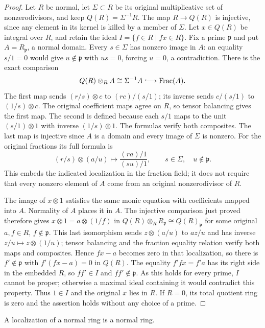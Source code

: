 \begin{proof}
Let $R$ be normal, let $\Sigma\subset R$ be its original
multiplicative set of nonzerodivisors, and keep
$Q(R)=\Sigma^{-1}R$. The map $R\to Q(R)$ is injective,
since any element in its kernel is killed by a member of $\Sigma$.
Let $x\in Q(R)$ be integral over $R$, and retain the ideal
$I=\{f\in R\mid fx\in R\}$.
Fix a prime $\mathfrak p$ and put $A=R_{\mathfrak p}$, a
normal domain. Every $s\in\Sigma$ has nonzero image in $A$:
an equality $s/1=0$ would give $u\notin\mathfrak p$ with
$us=0$, forcing $u=0$, a contradiction.
There is the exact comparison
$$
Q(R)\otimes_RA\cong\Sigma^{-1}A
\lhook\joinrel\longrightarrow\operatorname{Frac}(A).
$$
The first map sends $(r/s)\otimes c$ to $(rc)/(s/1)$;
its inverse sends $c/(s/1)$ to $(1/s)\otimes c$.
The original coefficient maps agree on $R$, so tensor balancing
gives the first map. The second is defined because each $s/1$
maps to the unit $(s/1)\otimes1$ with inverse $(1/s)\otimes1$.
The formulas verify both composites. The last map is injective
since $A$ is a domain and every image of $\Sigma$ is nonzero.
For the original fractions its full formula is
$$
(r/s)\otimes(a/u)\longmapsto
\frac{(ra)/1}{(su)/1},\qquad
s\in\Sigma,\quad u\notin\mathfrak p.
$$
This embeds the indicated localization in the fraction field;
it does not require that every nonzero element of $A$ come from
an original nonzerodivisor of $R$.

The image of $x\otimes1$ satisfies the same monic equation
with coefficients mapped into $A$. Normality of $A$ places
it in $A$. The injective comparison just proved therefore gives
$x\otimes1=a\otimes(1/f)$ in
$Q(R)\otimes_RR_{\mathfrak p}\cong Q(R)_{\mathfrak p}$ for
some original $a,f\in R$, $f\notin\mathfrak p$.
This last isomorphism sends $z\otimes(a/u)$ to $az/u$
and has inverse $z/u\mapsto z\otimes(1/u)$; tensor balancing
and the fraction equality relation verify both maps and composites.
Hence $fx-a$ becomes zero in that localization, so there is
$f'\notin\mathfrak p$ with $f'(fx-a)=0$ in $Q(R)$.
The equality $f'fx=f'a$ has its right side in the embedded $R$,
so $ff'\in I$ and $ff'\notin\mathfrak p$.
As this holds for every prime, $I$ cannot be proper; otherwise
a maximal ideal containing it would contradict this property.
Thus $1\in I$ and the original $x$ lies in $R$.
If $R=0$, its total quotient ring is zero and the assertion
holds without any choice of a prime.
\end{proof}

\begin{lemma}
\label{lemma-localization-normal-ring}
A localization of a normal ring is a normal ring.
\end{lemma}

